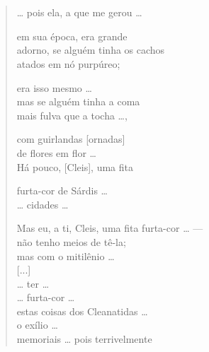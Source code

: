 \section*{}

\begin{verse}
\ldots{} pois ela, a que me gerou \ldots{}\\

\medskip

em sua época, era grande \\
adorno, se alguém tinha os cachos\\
atados em nó purpúreo;\\

\medskip

era isso mesmo \ldots{}\\
mas se alguém tinha a coma\\
mais fulva que a tocha \ldots{},\\

\medskip

com guirlandas [ornadas]\\
de flores em flor \ldots{}\\
Há pouco, [Cleis], uma fita\\

\medskip

furta-cor de Sárdis \ldots{}\\
\ldots{} cidades \ldots{}\\

\medskip

Mas eu, a ti, Cleis, uma fita furta-cor \ldots{} ---\\
não tenho meios de tê-la; \\
mas com o mitilênio \ldots{}\\[2mm]

\hspace*{16mm}[...]\\[2mm]

\ldots{} ter \ldots{}\\
\ldots{} furta-cor \ldots{}\\
estas coisas dos Cleanatidas \ldots{}\\
o exílio \ldots{}\\
memoriais \ldots{} pois terrivelmente 
\end{verse}

\medskip

